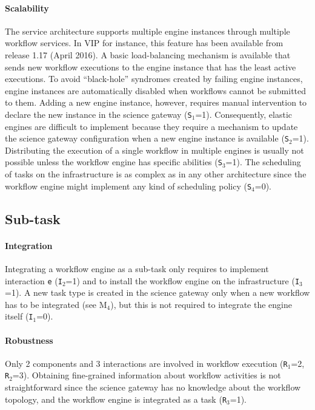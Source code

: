\documentclass[preprint,3p,twocolumn]{elsarticle}
\begin{document}
\paragraph{Scalability} The service architecture supports multiple
engine instances through multiple workflow services. In VIP for
instance, this feature has been available from release 1.17 (April
2016). A basic load-balancing mechanism is available that sends new
workflow executions to the engine instance that has the least active
executions. To avoid ``black-hole'' syndromes created by failing
engine instances, engine instances are automatically disabled when
workflows cannot be submitted to them. Adding a new engine instance,
however, requires manual intervention to declare the new instance in
the science gateway (\texttt{S$_1$}=1). Consequently, elastic engines
are difficult to implement because they require a mechanism to update
the science gateway configuration when a new engine instance is
available (\texttt{S$_2$}=1). Distributing the execution of a single
workflow in multiple engines is usually not possible unless the
workflow engine has specific abilities (\texttt{S$_3$}=1). The
scheduling of tasks on the infrastructure is as complex as in any
other architecture since the workflow engine might implement any kind
of scheduling policy (\texttt{S$_4$}=0).

\subsection{Sub-task}

\paragraph{Integration} Integrating a workflow engine as a sub-task
only requires to implement interaction \texttt{e} (\texttt{I$_2$}=1)
and to install the workflow engine on the infrastructure
(\texttt{I$_3$}=1). A new task type is created in the science gateway
only when a new workflow has to be integrated (see M$_4$), but this is
not required to integrate the engine itself (\texttt{I$_1$}=0).

\paragraph{Robustness} Only 2 components and 3 interactions are
involved in workflow execution (\texttt{R$_1$}=2,
\texttt{R$_2$}=3). Obtaining fine-grained information about workflow
activities is not straightforward since the science gateway has no
knowledge about the workflow topology, and the workflow engine is
integrated as a task (\texttt{R$_3$}=1).
\end{document}
